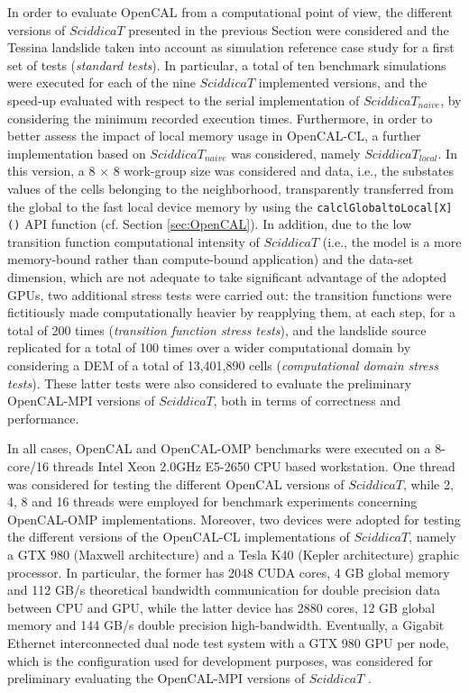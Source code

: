 In order to evaluate OpenCAL from a computational point of view, the
different versions of $SciddicaT$ presented in the previous Section
were considered and the Tessina landslide taken into account as
simulation reference case study for a first set of tests
(\emph{standard tests}). In particular, a total of ten benchmark
simulations were executed for each of the nine $SciddicaT$
implemented versions, and the speed-up evaluated with respect to the
serial implementation of $SciddicaT_{naive}$, by considering the
minimum recorded execution times. Furthermore, in order to better
assess the impact of local memory usage in OpenCAL-CL, a further
implementation based on $SciddicaT_{naive}$ was considered, namely
$SciddicaT_{local}$. In this version, a 8 $\times$ 8 work-group size was
considered and data, i.e., the substates values of the cells
belonging to the neighborhood, transparently transferred
from the global to the fast local device memory by using the
\verb'calclGlobaltoLocal[X]()' API function (cf. Section
\ref{sec:OpenCAL}). In addition, due to the low transition function
computational intensity of $SciddicaT$ (i.e., the model is a more memory-bound rather than compute-bound application) and the data-set dimension,
which are not adequate to take significant advantage of the adopted
GPUs, two additional stress tests were carried out: the transition
functions were fictitiously made computationally heavier by
reapplying them, at each step, for a total of 200 times
(\emph{transition function stress tests}), and the landslide source
replicated for a total of 100 times over a wider computational
domain by considering a DEM of a total of 13,401,890 cells
(\emph{computational domain stress tests}). These latter tests were
also considered to evaluate the preliminary OpenCAL-MPI versions of $SciddicaT$,
both in terms of correctness and performance.

In all cases, OpenCAL and OpenCAL-OMP benchmarks were executed on a
8-core/16 threads Intel Xeon 2.0GHz E5-2650 CPU based
workstation. One thread was considered for testing the different
OpenCAL versions of $SciddicaT$, while 2, 4, 8 and 16 threads were
employed for benchmark experiments concerning OpenCAL-OMP
implementations. Moreover, two devices were adopted for testing the
different versions of the OpenCAL-CL implementations of $SciddicaT$,
namely a GTX 980 (Maxwell architecture) and a Tesla K40 (Kepler
architecture) graphic processor. In particular, the former has 2048
CUDA cores, 4 GB global memory and 112 GB/s theoretical bandwidth
communication for double precision data between CPU and GPU, while
the latter device has 2880 cores, 12 GB global memory and 144 GB/s
double precision high-bandwidth. Eventually, a Gigabit Ethernet
interconnected dual node test system with a GTX 980 GPU per node,
which is the configuration used for development purposes, was
considered for preliminary evaluating the OpenCAL-MPI versions of
$SciddicaT$ .


